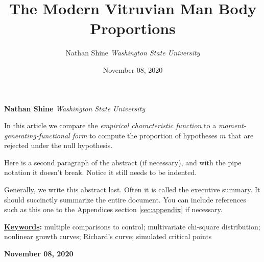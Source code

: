 \documentclass[]{article}
\title{\textbf{\textcolor{WSU.crimson}{The Modern Vitruvian
Man}} \newline \textbf{\textcolor{WSU.gray}{Body Proportions}}  }
\author{\Large Nathan
Shine\vspace{0.05in} \newline\normalsize\emph{Washington State
University}  }
\date{November 08, 2020}
\newcommand*{\authorfont}{\fontfamily{phv}\selectfont}
\renewenvironment{abstract}
 {{%
    \setlength{\leftmargin}{0mm}
    \setlength{\rightmargin}{\leftmargin}%
  }%
  \relax}
 {\endlist}
\begin{document}
	
%    


{%
\setlength{\parindent}{0pt}
\thispagestyle{plain}
{\fontsize{18}{20}\selectfont\raggedright 
\maketitle  %

}

{
   \vskip 13.5pt\relax \normalsize\fontsize{11}{12} 
   
\textbf{\authorfont Nathan Shine} \hskip 15pt \emph{\small Washington
State University}   

}

}








\begin{abstract}

    \hbox{\vrule height .2pt width 39.14pc}

    \vskip 8.5pt %

\noindent In this article we compare the
\emph{empirical characteristic function} \citep{Tukey:1977, Becker:1988}
to a \emph{moment-generating-functional form} to compute the proportion
of hypotheses \(m\) that are rejected under the null hypothesis.
\vspace{0.25in}

\noindent Here is a second paragraph of the abstract (if necessary), and
with the pipe notation it doesn't break. Notice it still needs to be
indented. \vspace{0.25in}

\noindent Generally, we write this abstract last. Often it is called the
executive summary. It should succinctly summarize the entire document.
You can include references such as this one to the Appendices section
\ref{sec:appendix} if necessary.


\vskip 8.5pt \noindent \textbf{\underline{Keywords}:} multiple
comparisons to control; multivariate chi-square distribution; nonlinear
growth curves; Richard's curve; simulated critical points \par

    




    
    \hbox{\vrule height .2pt width 39.14pc}
    \vskip 5pt 
    \hfill \textbf{\textcolor{WSU.gray}{ November 08, 2020 } }
    \vskip 5pt 
    
\end{abstract}
\end{document}
